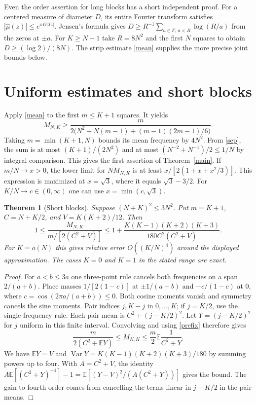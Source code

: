 \documentclass[11pt]{article}
\newtheorem{theorem}{Theorem}\newtheorem{lemma}[theorem]{Lemma}
\newcommand{\E}{\mathbb E}
\begin{document}
Even the order assertion for long blocks has a short independent proof. For a centered measure of diameter $D$, its entire Fourier transform satisfies $|\widehat\mu(z)|\le e^{\pi D|\Im z|}$. Jensen's formula gives $D\ge R^{-1}\sum_{a\in F,\,a<R}\log(R/a)$ from the zeros at $\pm a$. For $K\ge N-1$ take $R=8N^2$ and the first $N$ squares to obtain $D\ge(\log2)/(8N)$. The strip estimate \eqref{mean} supplies the more precise joint bounds below.

\section{Uniform estimates and short blocks}
Apply \eqref{mean} to the first $m\le K+1$ squares. It yields
\begin{equation}\label{prefix}
 M_{N,K}\ge\frac{m}{2\bigl(N^2+N(m-1)+(m-1)(2m-1)/6\bigr)}.
\end{equation}
Taking $m=\min(K+1,N)$ bounds its mean frequency by $4N^2$. From \eqref{sep}, the sum is at most $(K+1)/(2N^2)$ and at most $(N^{-2}+N^{-1})/2\le1/N$ by integral comparison. This gives the first assertion of Theorem~\ref{main}. If $m/N\to x>0$, the lower limit for $NM_{N,K}$ is at least $x/[2(1+x+x^2/3)]$. This expression is maximized at $x=\sqrt3$, where it equals $\sqrt3-3/2$. For $K/N\to c\in(0,\infty)$ one can use $x=\min(c,\sqrt3)$.

\begin{theorem}[Short blocks]\label{short}
Suppose $(N+K)^2\le3N^2$. Put $m=K+1$, $C=N+K/2$, and $V=K(K+2)/12$. Then
\[
 1\le \frac{M_{N,K}}{m/[2(C^2+V)]}
 \le 1+\frac{K(K-1)(K+2)(K+3)}{180 C^2(C^2+V)} .
\]
For $K=o(N)$ this gives relative error $O((K/N)^4)$ around the displayed approximation. The cases $K=0$ and $K=1$ in the stated range are exact.
\end{theorem}
\begin{proof}
For $a<b\le3a$ one three-point rule cancels both frequencies on a span $2/(a+b)$. Place masses $1/[2(1-c)]$ at $\pm1/(a+b)$ and $-c/(1-c)$ at $0$, where $c=\cos(2\pi a/(a+b))\le0$. Both cosine moments vanish and symmetry cancels the sine moments. Pair indices $j,K-j$ in $0,\ldots,K$; if $j=K/2$, use the single-frequency rule. Each pair mean is $C^2+(j-K/2)^2$. Let $Y=(j-K/2)^2$ for $j$ uniform in this finite interval. Convolving and using \eqref{prefix} therefore gives
\[
 \frac{m}{2(C^2+\E Y)}\le M_{N,K}\le \frac m2\E\frac1{C^2+Y}.
\]
We have $\E Y=V$ and $\operatorname{Var}Y=K(K-1)(K+2)(K+3)/180$ by summing powers up to four. With $A=C^2+V$, the identity
$A\E[(C^2+Y)^{-1}]-1=\E[(Y-V)^2/(A(C^2+Y))]$ gives the bound. The gain to fourth order comes from cancelling the terms linear in $j-K/2$ in the pair means.
\end{proof}
\end{document}
